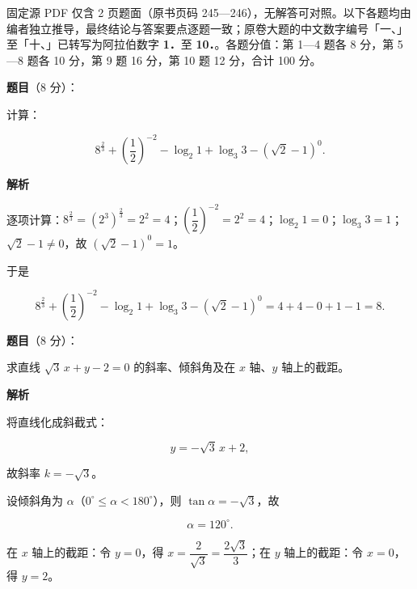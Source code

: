 

\begin{gktip}
固定源 PDF 仅含 2 页题面（原书页码 245—246），无解答可对照。以下各题均由编者独立推导，最终结论与答案要点逐题一致；原卷大题的中文数字编号「一、」至「十、」已转写为阿拉伯数字 \textbf{1．}至 \textbf{10．}。各题分值：第 1—4 题各 8 分，第 5—8 题各 10 分，第 9 题 16 分，第 10 题 12 分，合计 100 分。
\end{gktip}

\begin{answer}

\textbf{题目}（8 分）：

计算：

\nopagebreak[4]
\[
8^{\frac{2}{3}}+\left(\frac{1}{2}\right)^{-2}-\log_2 1+\log_3 3-\left(\sqrt{2}-1\right)^{0}.
\]

\textbf{解析}

逐项计算：$8^{\frac{2}{3}}=(2^{3})^{\frac{2}{3}}=2^{2}=4$；$\left(\dfrac{1}{2}\right)^{-2}=2^{2}=4$；$\log_2 1=0$；$\log_3 3=1$；$\sqrt{2}-1\ne0$，故 $\left(\sqrt{2}-1\right)^{0}=1$。

于是

\nopagebreak[4]
\[
8^{\frac{2}{3}}+\left(\frac{1}{2}\right)^{-2}-\log_2 1+\log_3 3-\left(\sqrt{2}-1\right)^{0}
=4+4-0+1-1=8.
\]


\end{answer}
\begin{answer}

\textbf{题目}（8 分）：

求直线 $\sqrt{3}\,x+y-2=0$ 的斜率、倾斜角及在 $x$ 轴、$y$ 轴上的截距。

\textbf{解析}

将直线化成斜截式：

\nopagebreak[4]
\[
y=-\sqrt{3}\,x+2,
\]

故斜率 $k=-\sqrt{3}$。

设倾斜角为 $\alpha$（$0^\circ\le\alpha<180^\circ$），则 $\tan\alpha=-\sqrt{3}$，故

\nopagebreak[4]
\[
\alpha=120^\circ.
\]

在 $x$ 轴上的截距：令 $y=0$，得 $x=\dfrac{2}{\sqrt{3}}=\dfrac{2\sqrt{3}}{3}$；在 $y$ 轴上的截距：令 $x=0$，得 $y=2$。


\end{answer}
